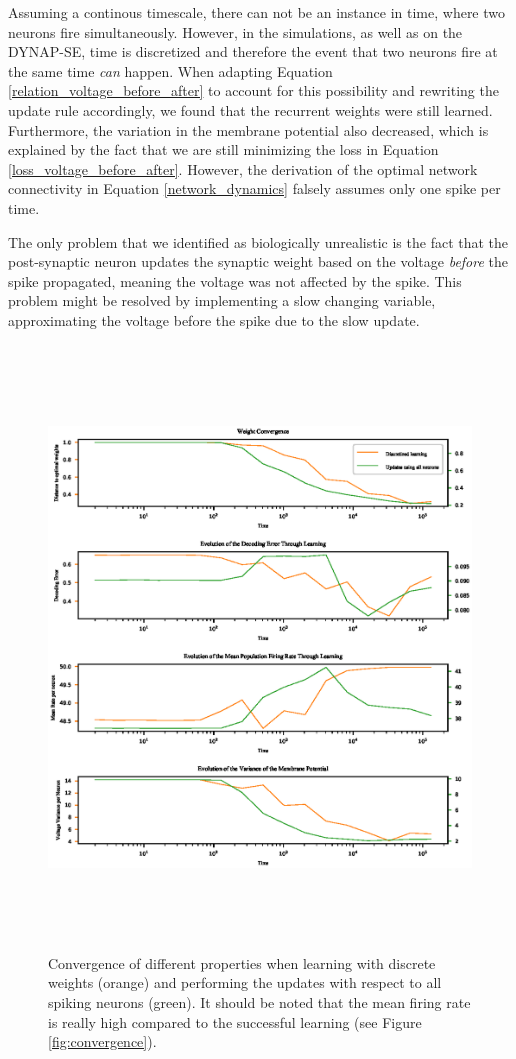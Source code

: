 \documentclass[twoside,11pt]{article}
\begin{document}
Assuming a continous timescale, there can not be an instance in time, where two neurons fire simultaneously.
However, in the simulations, as well as on the DYNAP-SE, time is discretized and therefore
the event that two neurons fire at the same time \emph{can} happen.
When adapting Equation \ref{relation_voltage_before_after} to account for this possibility and rewriting
the update rule accordingly, we found that the recurrent weights were still learned. Furthermore, the
variation in the membrane potential also decreased, which is explained by the fact that we are still
minimizing the loss in Equation \ref{loss_voltage_before_after}.
However, the derivation of the optimal network connectivity
in Equation \ref{network_dynamics} falsely assumes only one spike per time.

The only problem that we identified as biologically unrealistic is the fact that the post-synaptic
neuron updates the synaptic weight based on the voltage \emph{before} the spike propagated, meaning
the voltage was not affected by the spike. This problem might be resolved by implementing
a slow changing variable, approximating the voltage before the spike due to the slow update.

\newpage

\begin{figure}[!htb]
  \includegraphics[width = \columnwidth, height=16cm]{figures/convergence_d_vs_ua.eps}
  \caption{Convergence of different properties when learning with discrete weights (orange)
  and performing the updates with respect to all spiking neurons (green).
  It should be noted that the mean firing rate is really high compared to the successful learning (see
  Figure \ref{fig:convergence}).}
  \label{fig:convergence_ua_discrete}
\end{figure}
\end{document}
